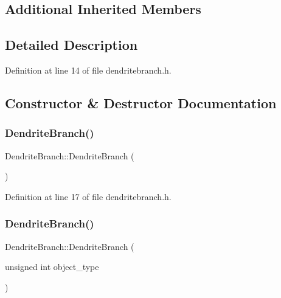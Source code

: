 \subsection*{Additional Inherited Members}


\subsection{Detailed Description}


Definition at line 14 of file dendritebranch.\+h.



\subsection{Constructor \& Destructor Documentation}
\mbox{\label{class_dendrite_branch_af391f5fd2379539523b3d2523c59ea8b}} 
\subsubsection{\texorpdfstring{Dendrite\+Branch()}{DendriteBranch()}\hspace{0.1cm}{\footnotesize\ttfamily [1/4]}}
{\footnotesize\ttfamily Dendrite\+Branch\+::\+Dendrite\+Branch (\begin{DoxyParamCaption}{ }\end{DoxyParamCaption})\hspace{0.3cm}{\ttfamily [inline]}}



Definition at line 17 of file dendritebranch.\+h.

\mbox{\label{class_dendrite_branch_a391ba1440a6c29a0752b03eb60357370}} 
\subsubsection{\texorpdfstring{Dendrite\+Branch()}{DendriteBranch()}\hspace{0.1cm}{\footnotesize\ttfamily [2/4]}}
{\footnotesize\ttfamily Dendrite\+Branch\+::\+Dendrite\+Branch (\begin{DoxyParamCaption}\item[{unsigned int}]{object\+\_\+type }\end{DoxyParamCaption})\hspace{0.3cm}{\ttfamily [inline]}}



